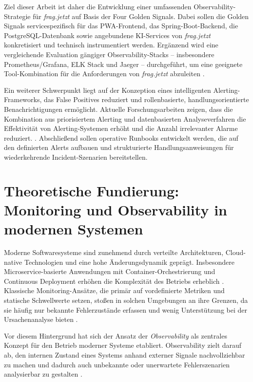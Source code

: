 Ziel dieser Arbeit ist daher die Entwicklung einer umfassenden Observability-Strategie für \emph{frag.jetzt} auf Basis der Four Golden Signals. Dabei sollen die Golden Signals servicespezifisch für das PWA-Frontend, das Spring-Boot-Backend, die PostgreSQL-Datenbank sowie angebundene KI-Services von \emph{frag.jetzt} konkretisiert und technisch instrumentiert werden. Ergänzend wird eine vergleichende Evaluation gängiger Observability-Stacks – insbesondere Prometheus/Grafana, ELK Stack und Jaeger – durchgeführt, um eine geeignete Tool-Kombination für die Anforderungen von \emph{frag.jetzt} abzuleiten \cite{banerjee2024comparative,giamattei2024monitoring}.

Ein weiterer Schwerpunkt liegt auf der Konzeption eines intelligenten Alerting-Frameworks, das False Positives reduziert und rollenbasierte, handlungsorientierte Benachrichtigungen ermöglicht. Aktuelle Forschungsarbeiten zeigen, dass die Kombination aus priorisiertem Alerting und datenbasierten Analyseverfahren die Effektivität von Alerting-Systemen erhöht und die Anzahl irrelevanter Alarme reduziert. \cite{jalalvand2024alert}. Abschließend sollen operative Runbooks entwickelt werden, die auf den definierten Alerts aufbauen und strukturierte Handlungsanweisungen für wiederkehrende Incident-Szenarien bereitstellen.



\section{Theoretische Fundierung: Monitoring und Observability in modernen Systemen}

Moderne Softwaresysteme sind zunehmend durch verteilte Architekturen, Cloud-native Technologien und eine hohe Änderungsdynamik geprägt. Insbesondere Microservice-basierte Anwendungen mit Container-Orchestrierung und Continuous Deployment erhöhen die Komplexität des Betriebs erheblich \cite{sakinala2025observability}. Klassische Monitoring-Ansätze, die primär auf vordefinierte Metriken und statische Schwellwerte setzen, stoßen in solchen Umgebungen an ihre Grenzen, da sie häufig nur bekannte Fehlerzustände erfassen und wenig Unterstützung bei der Ursachenanalyse bieten \cite{sridharan2018distributed}.

Vor diesem Hintergrund hat sich der Ansatz der \emph{Observability} als zentrales Konzept für den Betrieb moderner Systeme etabliert. Observability zielt darauf ab, den internen Zustand eines Systems anhand externer Signale nachvollziehbar zu machen und dadurch auch unbekannte oder unerwartete Fehlerszenarien analysierbar zu gestalten \cite{abieba2025advanced}.

